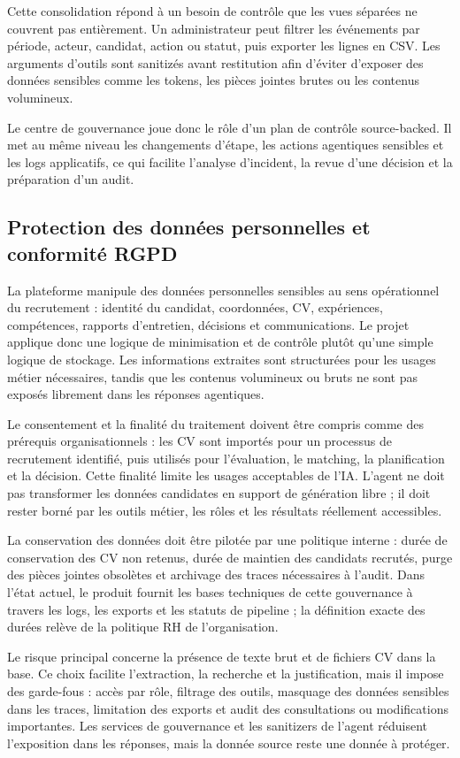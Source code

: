 Cette consolidation répond à un besoin de contrôle que les vues séparées ne couvrent pas entièrement. Un administrateur peut filtrer les événements par période, acteur, candidat, action ou statut, puis exporter les lignes en CSV. Les arguments d'outils sont sanitizés avant restitution afin d'éviter d'exposer des données sensibles comme les tokens, les pièces jointes brutes ou les contenus volumineux.

Le centre de gouvernance joue donc le rôle d'un plan de contrôle source-backed. Il met au même niveau les changements d'étape, les actions agentiques sensibles et les logs applicatifs, ce qui facilite l'analyse d'incident, la revue d'une décision et la préparation d'un audit.

\subsection{Protection des données personnelles et conformité RGPD}
La plateforme manipule des données personnelles sensibles au sens opérationnel du recrutement : identité du candidat, coordonnées, CV, expériences, compétences, rapports d'entretien, décisions et communications. Le projet applique donc une logique de minimisation et de contrôle plutôt qu'une simple logique de stockage. Les informations extraites sont structurées pour les usages métier nécessaires, tandis que les contenus volumineux ou bruts ne sont pas exposés librement dans les réponses agentiques.

Le consentement et la finalité du traitement doivent être compris comme des prérequis organisationnels : les CV sont importés pour un processus de recrutement identifié, puis utilisés pour l'évaluation, le matching, la planification et la décision. Cette finalité limite les usages acceptables de l'IA. L'agent ne doit pas transformer les données candidates en support de génération libre ; il doit rester borné par les outils métier, les rôles et les résultats réellement accessibles.

La conservation des données doit être pilotée par une politique interne : durée de conservation des CV non retenus, durée de maintien des candidats recrutés, purge des pièces jointes obsolètes et archivage des traces nécessaires à l'audit. Dans l'état actuel, le produit fournit les bases techniques de cette gouvernance à travers les logs, les exports et les statuts de pipeline ; la définition exacte des durées relève de la politique RH de l'organisation.

Le risque principal concerne la présence de texte brut et de fichiers CV dans la base. Ce choix facilite l'extraction, la recherche et la justification, mais il impose des garde-fous : accès par rôle, filtrage des outils, masquage des données sensibles dans les traces, limitation des exports et audit des consultations ou modifications importantes. Les services de gouvernance et les sanitizers de l'agent réduisent l'exposition dans les réponses, mais la donnée source reste une donnée à protéger.

